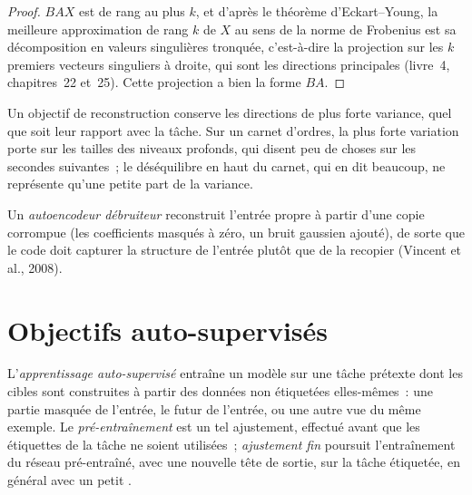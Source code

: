 \begin{proof}
$BAX$ est de rang au plus $k$, et d'après le théorème d'Eckart--Young, la meilleure approximation de rang $k$ de $X$ au sens de la norme de Frobenius est
sa décomposition en valeurs singulières tronquée, c'est-à-dire la projection sur les $k$ premiers vecteurs singuliers à droite, qui sont les
directions principales (livre~4, chapitres~22 et~25). Cette projection a bien la forme $BA$.
\end{proof}

Un objectif de reconstruction conserve les directions de plus forte variance, quel que soit leur rapport avec la tâche. Sur un carnet d'ordres,
la plus forte variation porte sur les tailles des niveaux profonds, qui disent peu de choses sur les secondes suivantes~; le
déséquilibre en haut du carnet, qui en dit beaucoup, ne représente qu'une petite part de la variance.

\begin{definition}\label{def:ml:representation-learning:dae}
Un \emph{autoencodeur débruiteur} reconstruit l'entrée propre à partir d'une copie corrompue (les coefficients
masqués à zéro, un bruit gaussien ajouté), de sorte que le code doit capturer la structure de l'entrée plutôt que de la recopier (Vincent
et al., 2008).
\end{definition}

\section{Objectifs auto-supervisés}

\begin{definition}\label{def:ml:representation-learning:ssl}
L'\emph{apprentissage auto-supervisé} entraîne un modèle sur une tâche prétexte dont les cibles sont construites à partir des
données non étiquetées elles-mêmes~: une partie masquée de l'entrée, le futur de l'entrée, ou une autre vue du même exemple.
Le \emph{pré-entraînement} est un tel ajustement, effectué avant que les étiquettes de la tâche ne soient utilisées~; \emph{ajustement fin}
poursuit l'entraînement du réseau pré-entraîné, avec une nouvelle tête de sortie, sur la tâche étiquetée, en général avec un petit .
\end{definition}

